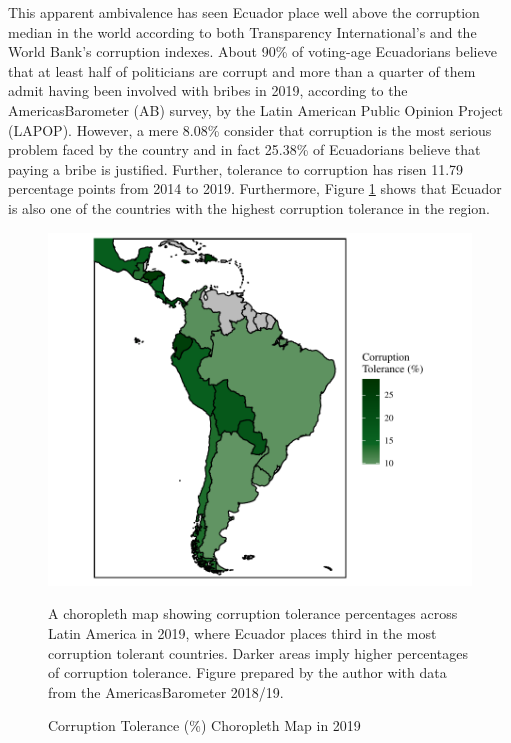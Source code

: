 \documentclass[12pt,a4]{article}\usepackage[]{graphicx}\usepackage[]{xcolor}
\begin{document}
This apparent ambivalence has seen Ecuador place well above the corruption median in the world according to both Transparency International's and the World Bank's corruption indexes. About 90\% of voting-age Ecuadorians believe that at least half of politicians are corrupt and more than a quarter of them admit having been involved with bribes in 2019, according to the AmericasBarometer (AB) survey, by the Latin American Public Opinion Project (LAPOP). However, a mere 8.08\% consider that corruption is the most serious problem faced by the country and in fact 25.38\% of Ecuadorians believe that paying a bribe is justified. Further, tolerance to corruption has risen 11.79 percentage points from 2014 to 2019. Furthermore, Figure \ref{fig:ctolmap} shows that Ecuador is also one of the countries with the highest corruption tolerance in the region.



\begin{figure}[htbp]
  \label{fig:ctolmap}
      \caption{Corruption Tolerance (\%) Choropleth Map in 2019}
    \begin{center}
    \includegraphics{images/ctol_map.pdf}
    \end{center}

A choropleth map showing corruption tolerance percentages across Latin America in 2019, where Ecuador places third in the most corruption tolerant countries. Darker areas imply higher percentages of corruption tolerance. Figure prepared by the author with data from the \textregistered AmericasBarometer 2018/19. 
\end{figure}
\end{document}
